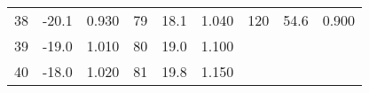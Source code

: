 \begin{table}
\begin{tabular}{c c c@{\hskip 0.5cm}||@{\hskip 0.5cm} c c c@{\hskip 0.5cm} ||@{\hskip 0.5cm} c c c}
38  &    -20.1    &       0.930   & 79  &    18.1     &       1.040   &  120 &    54.6     &       0.900  \\                                     
39  &    -19.0      &     1.010   & 80  &    19.0     &       1.100    &      &             &             \\                 
40  &    -18.0      &     1.020   & 81  &    19.8     &       1.150   &      &             &             \\                    

    \end{tabular}
\end{table}



